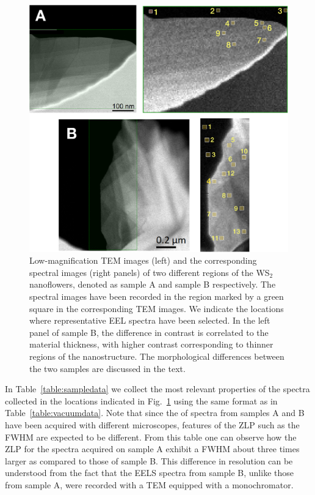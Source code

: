 \begin{figure}[t]
\begin{centering}
  \includegraphics[width=0.87\linewidth]{plots/Spectra_location.pdf}
  \caption{Low-magnification TEM images (left) and the corresponding
    spectral images (right panels) of two different regions of
    the WS$_2$ nanoflowers, denoted as sample A and sample B respectively.
    The spectral images have been recorded in the region marked by a green square
    in the corresponding TEM images.
    We indicate the locations where representative
    EEL spectra have been selected. 
    In the left panel of sample B, the difference in contrast is correlated to the material
    thickness, with higher contrast corresponding to thinner regions of the nanostructure.
    The morphological differences between the two samples are discussed in the text.
  }
\label{fig:ws2positions}
\end{centering}
\end{figure}

In Table~\ref{table:sampledata} we collect the most relevant properties of the spectra collected
in the locations indicated in Fig.~\ref{fig:ws2positions} using the same format as
in Table~\ref{table:vacuumdata}.
%
Note that since the of spectra from samples A and B
have been acquired with different microscopes, features of the ZLP
such as the FWHM are expected to be different.
%
From this table one can observe how the ZLP for the spectra acquired on sample A exhibit
a FWHM about three times larger as compared to those of sample B.
%
This difference in resolution can be understood from the fact that the EELS spectra from sample B, unlike those
from sample A, were recorded with a TEM equipped with a monochromator.

